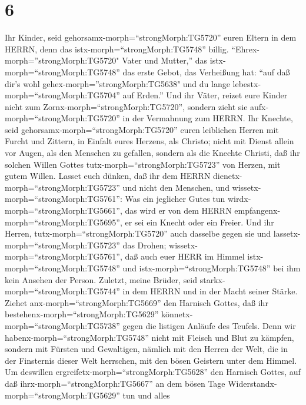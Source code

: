 \hypertarget{section-5}{%
\section{6}\label{section-5}}

 Ihr Kinder, seid gehorsamx-morph=``strongMorph:TG5720''
euren Eltern in dem HERRN, denn das istx-morph=``strongMorph:TG5748''
billig.  ``Ehrex-morph=''strongMorph:TG5720" Vater und
Mutter,'' das istx-morph=``strongMorph:TG5748'' das erste Gebot, das
Verheißung hat:  ``auf daß dir's wohl
gehex-morph=''strongMorph:TG5638" und du lange
lebestx-morph=``strongMorph:TG5704'' auf Erden.''  Und ihr
Väter, reizet eure Kinder nicht zum Zornx-morph=``strongMorph:TG5720'',
sondern zieht sie aufx-morph=``strongMorph:TG5720'' in der Vermahnung
zum HERRN.  Ihr Knechte, seid
gehorsamx-morph=``strongMorph:TG5720'' euren leiblichen Herren mit
Furcht und Zittern, in Einfalt eures Herzens, als Christo; 
nicht mit Dienst allein vor Augen, als den Menschen zu gefallen, sondern
als die Knechte Christi, daß ihr solchen Willen Gottes
tutx-morph=``strongMorph:TG5723'' von Herzen, mit gutem Willen.
 Lasset euch dünken, daß ihr dem HERRN
dienetx-morph=``strongMorph:TG5723'' und nicht den Menschen,
 und wissetx-morph=``strongMorph:TG5761'': Was ein jeglicher
Gutes tun wirdx-morph=``strongMorph:TG5661'', das wird er von dem HERRN
empfangenx-morph=``strongMorph:TG5695'', er sei ein Knecht oder ein
Freier.  Und ihr Herren, tutx-morph=``strongMorph:TG5720''
auch dasselbe gegen sie und lassetx-morph=``strongMorph:TG5723'' das
Drohen; wissetx-morph=``strongMorph:TG5761'', daß auch euer HERR im
Himmel istx-morph=``strongMorph:TG5748'' und
istx-morph=``strongMorph:TG5748'' bei ihm kein Ansehen der Person.
 Zuletzt, meine Brüder, seid
starkx-morph=``strongMorph:TG5744'' in dem HERRN und in der Macht seiner
Stärke.  Ziehet anx-morph=``strongMorph:TG5669'' den
Harnisch Gottes, daß ihr bestehenx-morph=``strongMorph:TG5629''
könnetx-morph=``strongMorph:TG5738'' gegen die listigen Anläufe des
Teufels.  Denn wir habenx-morph=``strongMorph:TG5748''
nicht mit Fleisch und Blut zu kämpfen, sondern mit Fürsten und
Gewaltigen, nämlich mit den Herren der Welt, die in der Finsternis
dieser Welt herrschen, mit den bösen Geistern unter dem Himmel.
 Um deswillen ergreifetx-morph=``strongMorph:TG5628'' den
Harnisch Gottes, auf daß ihrx-morph=``strongMorph:TG5667'' an dem bösen
Tage Widerstandx-morph=``strongMorph:TG5629'' tun und alles
